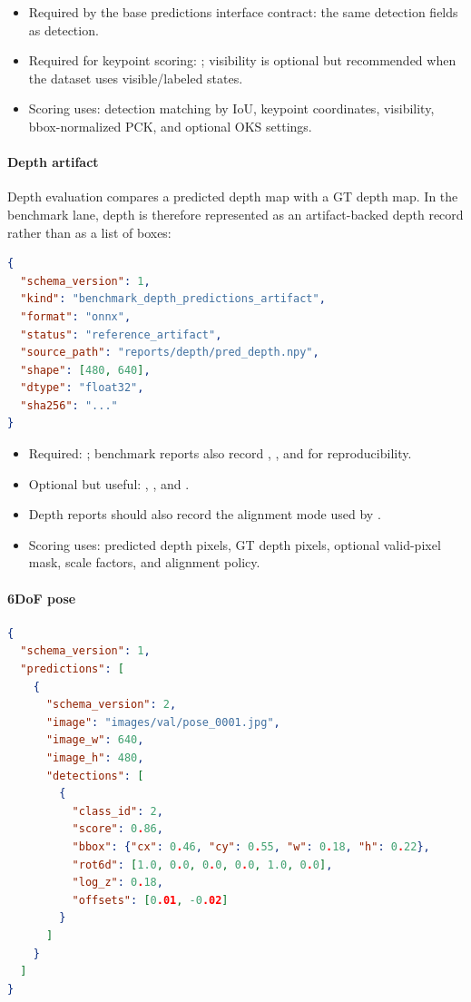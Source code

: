 \begin{itemize}
  \item Required by the base predictions interface contract: the same detection fields as detection.
  \item Required for keypoint scoring: ; visibility  is optional but recommended when the dataset uses visible/labeled states.
  \item Scoring uses: detection matching by IoU, keypoint coordinates, visibility, bbox-normalized PCK, and optional OKS settings.
\end{itemize}

\paragraph{Depth artifact}
Depth evaluation compares a predicted depth map with a GT depth map. In the benchmark lane, depth is therefore represented as an artifact-backed depth record rather than as a list of boxes:

\begin{lstlisting}[language=json,basicstyle=\ttfamily\footnotesize]
{
  "schema_version": 1,
  "kind": "benchmark_depth_predictions_artifact",
  "format": "onnx",
  "status": "reference_artifact",
  "source_path": "reports/depth/pred_depth.npy",
  "shape": [480, 640],
  "dtype": "float32",
  "sha256": "..."
}
\end{lstlisting}

\begin{itemize}
  \item Required: ; benchmark reports also record , , and  for reproducibility.
  \item Optional but useful: , , and .
  \item Depth reports should also record the alignment mode used by .
  \item Scoring uses: predicted depth pixels, GT depth pixels, optional valid-pixel mask, scale factors, and alignment policy.
\end{itemize}

\paragraph{6DoF pose}\mbox{}\par
\begin{lstlisting}[language=json,basicstyle=\ttfamily\footnotesize]
{
  "schema_version": 1,
  "predictions": [
    {
      "schema_version": 2,
      "image": "images/val/pose_0001.jpg",
      "image_w": 640,
      "image_h": 480,
      "detections": [
        {
          "class_id": 2,
          "score": 0.86,
          "bbox": {"cx": 0.46, "cy": 0.55, "w": 0.18, "h": 0.22},
          "rot6d": [1.0, 0.0, 0.0, 0.0, 1.0, 0.0],
          "log_z": 0.18,
          "offsets": [0.01, -0.02]
        }
      ]
    }
  ]
}
\end{lstlisting}

